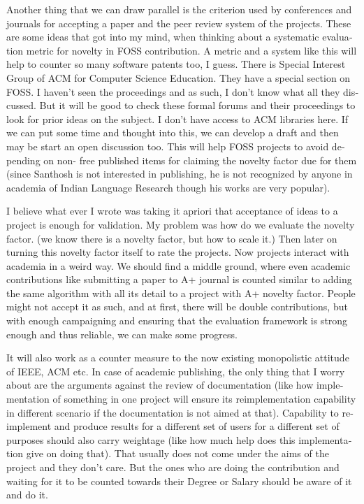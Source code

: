 \begin{english}
Another thing that we can draw parallel is the criterion used
by conferences and journals for accepting a paper and the peer review system
of the projects. These are some ideas that got into my mind, when thinking about a
systematic evaluation metric for novelty in FOSS contribution. A metric
and a system like this will help to counter so many software patents too, I guess.
There is Special Interest Group of ACM for Computer Science Education.
They have a special section on FOSS. I haven't seen the proceedings and as such, I
don't know what all they discussed. But it will be good to check these
formal forums and their proceedings to look for prior ideas on the subject.
I don't have access to ACM libraries here. If we can put some time and
thought into this, we can develop a draft and then may be start an open
discussion too. This will help FOSS projects to avoid depending on non-
free published items for claiming the novelty factor due for them (since
Santhosh is not interested in publishing, he is not recognized by anyone
in academia of Indian Language Research though his works are very popular).


I believe what ever I wrote was taking it apriori that acceptance of ideas
to a project is enough for validation. My problem was how do we evaluate
the novelty factor. (we know there is a novelty factor, but how to scale it.)
Then later on turning this novelty factor itself to rate the projects.
Now projects interact with academia in a weird way. We should find a middle
ground, where even academic contributions like submitting a paper to A+
journal is counted similar to adding the same algorithm with all its detail
to a project with A+ novelty factor. People might not accept it as such,
and at first, there will be double contributions, but with enough campaigning
and ensuring that the evaluation framework is strong enough and thus reliable,
we can make some progress.

It will also work as a counter measure to the now existing
monopolistic attitude of IEEE, ACM etc. In case of academic publishing, the
only thing that I worry about are the arguments against the review of documentation 
(like how implementation of something in one project will ensure its
reimplementation capability in different scenario if the documentation
is not aimed at that). Capability to re-implement and produce results for
a different set of users for a different set of purposes should also carry
weightage (like how much help does this implementation give on doing that).
That usually does not come under the aims of the project and they don't care.
But the ones who are doing the contribution and waiting for it to be counted
towards their Degree or Salary should be aware of it and do it.


\end{english}
